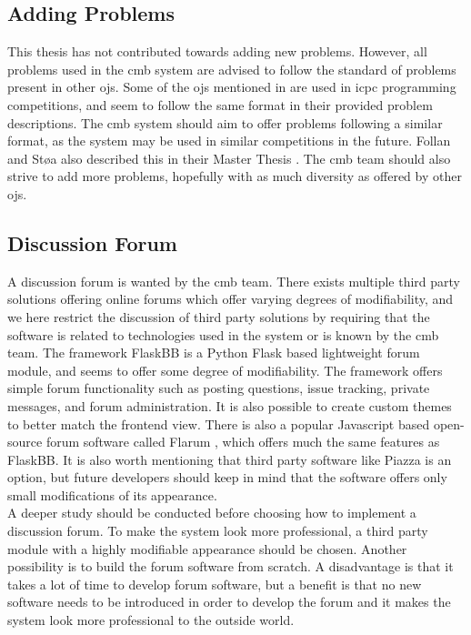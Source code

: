 \subsection{Adding Problems}
\label{sub-sec:prop-problems}
This thesis has not contributed towards adding new problems. However, all problems used in the \gls{cmb} system are advised to follow the standard of problems present in other \glspl{oj}. Some of the \glspl{oj} mentioned in  are used in \gls{icpc} programming competitions, and seem to follow the same format in their provided problem descriptions. The \gls{cmb} system should aim to offer problems following a similar format, as the system may be used in similar competitions in the future. Follan and Støa also described this in their Master Thesis \cite{mt:T&S}. The \gls{cmb} team should also strive to add more problems, hopefully with as much diversity as offered by other \glspl{oj}.

\subsection{Discussion Forum}
\label{sub-sec:prop-forum}
A discussion forum is wanted by the \gls{cmb} team. There exists multiple third party solutions offering online forums which offer varying degrees of modifiability, and we here restrict the discussion of third party solutions by requiring that the software is related to technologies used in the system or is known by the \gls{cmb} team. The framework FlaskBB \cite{FLASKBB} is a Python Flask based lightweight forum module, and seems to offer some degree of modifiability. The framework offers simple forum functionality such as posting questions, issue tracking, private messages, and forum administration. It is also possible to create custom themes to better match the frontend view. There is also a popular Javascript based open-source forum software called Flarum \cite{FLARUM}, which offers much the same features as FlaskBB. It is also worth mentioning that third party software like Piazza is an option, but future developers should keep in mind that the software offers only small modifications of its appearance. \\

A deeper study should be conducted before choosing how to implement a discussion forum. To make the system look more professional, a third party module with a highly modifiable appearance should be chosen. Another possibility is to build the forum software from scratch. A disadvantage is that it takes a lot of time to develop forum software, but a benefit is that no new software needs to be introduced in order to develop the forum and it makes the system look more professional to the outside world.
